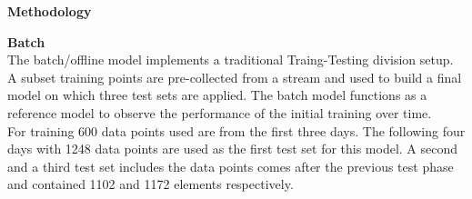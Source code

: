 \begin{center} \textbf{\huge Methodology} \end{center}
\textbf{\large Batch}\\
The batch/offline model implements a traditional Traing-Testing division setup. A subset training points are pre-collected from a stream and used to build a final model on which three test sets are applied. The batch model functions as a reference model to observe the performance of the initial training over time. \\
For training 600 data points used are from the first three days. The following four days with 1248 data points are used as the first test set for this model. A second and a third test set includes the data points comes after the previous test phase and contained 1102 and 1172 elements respectively.\\

